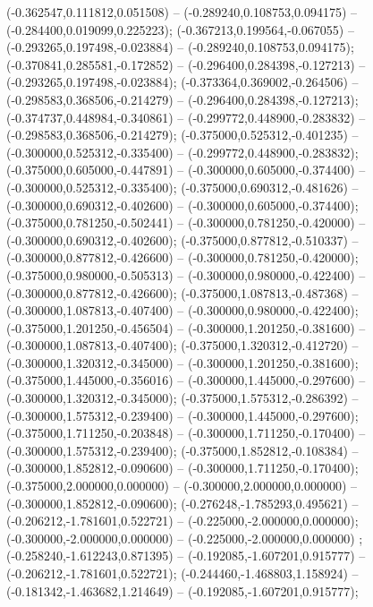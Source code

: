  (-0.362547,0.111812,0.051508) -- (-0.289240,0.108753,0.094175) -- (-0.284400,0.019099,0.225223);
 (-0.367213,0.199564,-0.067055) -- (-0.293265,0.197498,-0.023884) -- (-0.289240,0.108753,0.094175);
 (-0.370841,0.285581,-0.172852) -- (-0.296400,0.284398,-0.127213) -- (-0.293265,0.197498,-0.023884);
 (-0.373364,0.369002,-0.264506) -- (-0.298583,0.368506,-0.214279) -- (-0.296400,0.284398,-0.127213);
 (-0.374737,0.448984,-0.340861) -- (-0.299772,0.448900,-0.283832) -- (-0.298583,0.368506,-0.214279);
 (-0.375000,0.525312,-0.401235) -- (-0.300000,0.525312,-0.335400) -- (-0.299772,0.448900,-0.283832);
 (-0.375000,0.605000,-0.447891) -- (-0.300000,0.605000,-0.374400) -- (-0.300000,0.525312,-0.335400);
 (-0.375000,0.690312,-0.481626) -- (-0.300000,0.690312,-0.402600) -- (-0.300000,0.605000,-0.374400);
 (-0.375000,0.781250,-0.502441) -- (-0.300000,0.781250,-0.420000) -- (-0.300000,0.690312,-0.402600);
 (-0.375000,0.877812,-0.510337) -- (-0.300000,0.877812,-0.426600) -- (-0.300000,0.781250,-0.420000);
 (-0.375000,0.980000,-0.505313) -- (-0.300000,0.980000,-0.422400) -- (-0.300000,0.877812,-0.426600);
 (-0.375000,1.087813,-0.487368) -- (-0.300000,1.087813,-0.407400) -- (-0.300000,0.980000,-0.422400);
 (-0.375000,1.201250,-0.456504) -- (-0.300000,1.201250,-0.381600) -- (-0.300000,1.087813,-0.407400);
 (-0.375000,1.320312,-0.412720) -- (-0.300000,1.320312,-0.345000) -- (-0.300000,1.201250,-0.381600);
 (-0.375000,1.445000,-0.356016) -- (-0.300000,1.445000,-0.297600) -- (-0.300000,1.320312,-0.345000);
 (-0.375000,1.575312,-0.286392) -- (-0.300000,1.575312,-0.239400) -- (-0.300000,1.445000,-0.297600);
 (-0.375000,1.711250,-0.203848) -- (-0.300000,1.711250,-0.170400) -- (-0.300000,1.575312,-0.239400);
 (-0.375000,1.852812,-0.108384) -- (-0.300000,1.852812,-0.090600) -- (-0.300000,1.711250,-0.170400);
 (-0.375000,2.000000,0.000000) -- (-0.300000,2.000000,0.000000) -- (-0.300000,1.852812,-0.090600);
 (-0.276248,-1.785293,0.495621) -- (-0.206212,-1.781601,0.522721) -- (-0.225000,-2.000000,0.000000);
 (-0.300000,-2.000000,0.000000) -- (-0.225000,-2.000000,0.000000) ;
 (-0.258240,-1.612243,0.871395) -- (-0.192085,-1.607201,0.915777) -- (-0.206212,-1.781601,0.522721);
 (-0.244460,-1.468803,1.158924) -- (-0.181342,-1.463682,1.214649) -- (-0.192085,-1.607201,0.915777);
